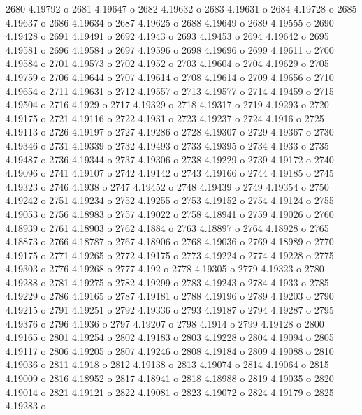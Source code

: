  2680  4.19792  o
 2681  4.19647  o
 2682  4.19632  o
 2683  4.19631  o
 2684  4.19728  o
 2685  4.19637  o
 2686  4.19634  o
 2687  4.19625  o
 2688  4.19649  o
 2689  4.19555  o
 2690  4.19428  o
 2691  4.19491  o
 2692  4.1943  o
 2693  4.19453  o
 2694  4.19642  o
 2695  4.19581  o
 2696  4.19584  o
 2697  4.19596  o
 2698  4.19696  o
 2699  4.19611  o
 2700  4.19584  o
 2701  4.19573  o
 2702  4.1952  o
 2703  4.19604  o
 2704  4.19629  o
 2705  4.19759  o
 2706  4.19644  o
 2707  4.19614  o
 2708  4.19614  o
 2709  4.19656  o
 2710  4.19654  o
 2711  4.19631  o
 2712  4.19557  o
 2713  4.19577  o
 2714  4.19459  o
 2715  4.19504  o
 2716  4.1929  o
 2717  4.19329  o
 2718  4.19317  o
 2719  4.19293  o
 2720  4.19175  o
 2721  4.19116  o
 2722  4.1931  o
 2723  4.19237  o
 2724  4.1916  o
 2725  4.19113  o
 2726  4.19197  o
 2727  4.19286  o
 2728  4.19307  o
 2729  4.19367  o
 2730  4.19346  o
 2731  4.19339  o
 2732  4.19493  o
 2733  4.19395  o
 2734  4.1933  o
 2735  4.19487  o
 2736  4.19344  o
 2737  4.19306  o
 2738  4.19229  o
 2739  4.19172  o
 2740  4.19096  o
 2741  4.19107  o
 2742  4.19142  o
 2743  4.19166  o
 2744  4.19185  o
 2745  4.19323  o
 2746  4.1938  o
 2747  4.19452  o
 2748  4.19439  o
 2749  4.19354  o
 2750  4.19242  o
 2751  4.19234  o
 2752  4.19255  o
 2753  4.19152  o
 2754  4.19124  o
 2755  4.19053  o
 2756  4.18983  o
 2757  4.19022  o
 2758  4.18941  o
 2759  4.19026  o
 2760  4.18939  o
 2761  4.18903  o
 2762  4.1884  o
 2763  4.18897  o
 2764  4.18928  o
 2765  4.18873  o
 2766  4.18787  o
 2767  4.18906  o
 2768  4.19036  o
 2769  4.18989  o
 2770  4.19175  o
 2771  4.19265  o
 2772  4.19175  o
 2773  4.19224  o
 2774  4.19228  o
 2775  4.19303  o
 2776  4.19268  o
 2777  4.192  o
 2778  4.19305  o
 2779  4.19323  o
 2780  4.19288  o
 2781  4.19275  o
 2782  4.19299  o
 2783  4.19243  o
 2784  4.1933  o
 2785  4.19229  o
 2786  4.19165  o
 2787  4.19181  o
 2788  4.19196  o
 2789  4.19203  o
 2790  4.19215  o
 2791  4.19251  o
 2792  4.19336  o
 2793  4.19187  o
 2794  4.19287  o
 2795  4.19376  o
 2796  4.1936  o
 2797  4.19207  o
 2798  4.1914  o
 2799  4.19128  o
 2800  4.19165  o
 2801  4.19254  o
 2802  4.19183  o
 2803  4.19228  o
 2804  4.19094  o
 2805  4.19117  o
 2806  4.19205  o
 2807  4.19246  o
 2808  4.19184  o
 2809  4.19088  o
 2810  4.19036  o
 2811  4.1918  o
 2812  4.19138  o
 2813  4.19074  o
 2814  4.19064  o
 2815  4.19009  o
 2816  4.18952  o
 2817  4.18941  o
 2818  4.18988  o
 2819  4.19035  o
 2820  4.19014  o
 2821  4.19121  o
 2822  4.19081  o
 2823  4.19072  o
 2824  4.19179  o
 2825  4.19283  o
